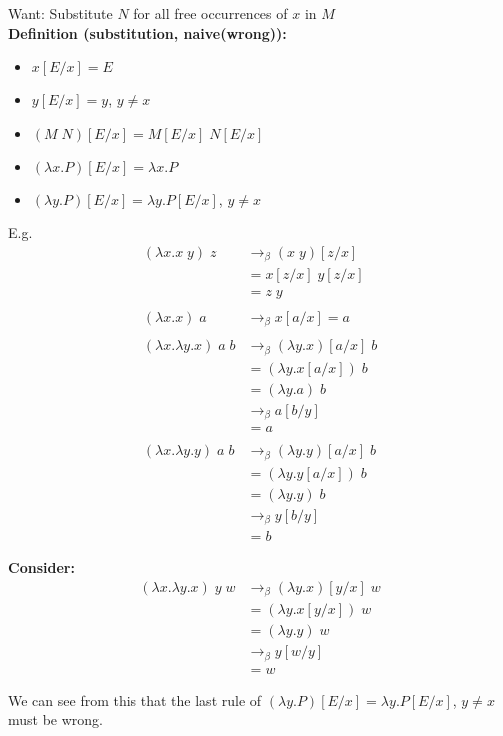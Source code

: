 \documentclass[11pt]{article}
\begin{document}
Want: Substitute $N$ for all free occurrences of $x$ in $M$ \\

\textbf{Definition (substitution, naive(wrong)):} 
\begin{itemize}
	\item[] $x[E/x] = E$
	\item[] $y[E/x] = y$, $y \neq x$
	\item[] $(M\;N)[E/x] = M[E/x]\;N[E/x]$
	\item[] $(\lambda x.P)[E/x] = \lambda x.P$
	\item[] $(\lambda y.P)[E/x] = \lambda y. P[E/x]$, $y \neq x$
\end{itemize}

E.g. 
\begin{align*}
(\lambda x.x\;y)\;z &\rightarrow_\beta (x\;y)[z/x] \\
&= x[z/x]\;y[z/x] \\
&= z\;y \\ \\
(\lambda x.x)\;a &\rightarrow_\beta x[a/x] = a \\ \\
(\lambda x. \lambda y.x)\;a\;b &\rightarrow_\beta (\lambda y.x)[a/x]\;b \\
&= (\lambda y.x[a/x])\;b \\
&= (\lambda y.a)\;b \\
&\rightarrow_\beta a[b/y] \\
&= a \\ \\
(\lambda x. \lambda y.y)\;a\;b &\rightarrow_\beta (\lambda y.y)[a/x]\;b \\
&= (\lambda y.y[a/x])\;b \\
&= (\lambda y.y)\;b \\
&\rightarrow_\beta y[b/y] \\
&= b
\end{align*}

\textbf{Consider:}
\begin{align*}
(\lambda x. \lambda y.x)\;y\;w &\rightarrow_\beta (\lambda y.x)[y/x]\;w \\
&= (\lambda y.x[y/x])\;w \\
&= (\lambda y.y)\;w \\
&\rightarrow_\beta y[w/y] \\
&= w
\end{align*}

We can see from this that the last rule of $(\lambda y.P)[E/x] = \lambda y.P[E/x]$, $y \neq x$ must be wrong. \\
\end{document}
